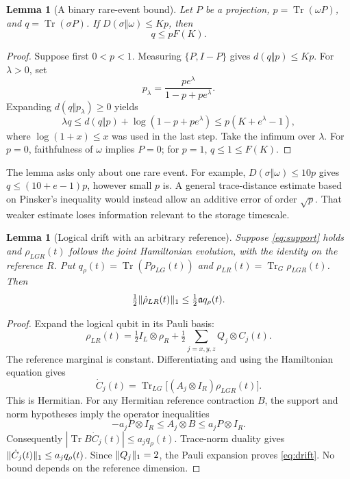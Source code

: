 \documentclass[11pt,reqno]{amsart}
\numberwithin{equation}{section}
\newtheorem{lemma}[theorem]{Lemma}
\theoremstyle{definition}
\theoremstyle{remark}
\newcommand{\Tr}{\operatorname{Tr}}
\newcommand{\pa}{\mathfrak a}
\DeclarePairedDelimiter{\norm}{\lVert}{\rVert}
\begin{document}
\begin{lemma}[A binary rare-event bound]\label{lem:binary}
Let \(P\) be a projection, \(p=\Tr(\omega P)\), and \(q=\Tr(\sigma P)\).
If \(D(\sigma\Vert\omega)\le Kp\), then
\begin{equation}\label{eq:binary}
                         q\le pF(K).
\end{equation}
\end{lemma}
\begin{proof}
Suppose first \(0<p<1\). Measuring \(\{P,I-P\}\) gives
\(d(q\Vert p)\le Kp\). For \(\lambda>0\), set
\[
 p_\lambda=\frac{pe^\lambda}{1-p+pe^\lambda}.
\]
Expanding \(d(q\Vert p_\lambda)\ge0\) yields
\[
 \lambda q
 \le d(q\Vert p)+\log(1-p+pe^\lambda)
 \le p(K+e^\lambda-1),
\]
where \(\log(1+x)\le x\) was used in the last step.
Take the infimum over \(\lambda\).
For \(p=0\), faithfulness of \(\omega\) implies \(P=0\); for \(p=1\),
\(q\le1\le F(K)\).
\end{proof}

The lemma asks only about one rare event. For example,
\(D(\sigma\Vert\omega)\le10p\) gives
\(q\le(10+e-1)p\), however small \(p\) is. A general trace-distance
estimate based on Pinsker's inequality would instead allow an additive
error of order \(\sqrt p\). That weaker estimate loses information
relevant to the storage timescale.

\begin{lemma}[Logical drift with an arbitrary reference]\label{lem:drift}
Suppose \eqref{eq:support} holds and \(\rho_{LGR}(t)\) follows the joint
Hamiltonian evolution, with the identity on the reference \(R\).
Put \(q_\rho(t)=\Tr(P\rho_{LG}(t))\) and
\(\rho_{LR}(t)=\Tr_G\rho_{LGR}(t)\). Then
\begin{equation}\label{eq:drift}
          \tfrac12\norm{\dot\rho_{LR}(t)}_1
                    \le \tfrac12\pa q_\rho(t).
\end{equation}
\end{lemma}
\begin{proof}
Expand the logical qubit in its Pauli basis:
\[
 \rho_{LR}(t)=\tfrac12 I_L\otimes\rho_R+
                 \tfrac12\sum_{j=x,y,z}Q_j\otimes C_j(t).
\]
The reference marginal is constant. Differentiating and using the
Hamiltonian equation gives
\[
 \dot C_j(t)=
   \Tr_{LG}\big[(A_j\otimes I_R)\rho_{LGR}(t)\big].
\]
This is Hermitian. For any Hermitian reference contraction \(B\),
the support and norm hypotheses imply the operator inequalities
\[
 -a_j P\otimes I_R\le A_j\otimes B\le a_j P\otimes I_R.
\]
Consequently \(|\Tr B\dot C_j(t)|\le a_jq_\rho(t)\).
Trace-norm duality gives \(\norm{\dot C_j(t)}_1\le a_jq_\rho(t)\).
Since \(\norm{Q_j}_1=2\), the Pauli expansion proves
\eqref{eq:drift}. No bound depends on the reference dimension.
\end{proof}
\end{document}
